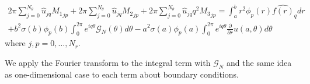 \begin{eqnarray}
 2\pi \sum_{j=0}^{N_\theta} \hat{u}_{jq} {M_1}_{jp}
+ 2\pi \sum_{j=0}^{N_\theta} \hat{u}_{jq} {M_2}_{jp} + 2\pi
\sum_{j=0}^{N_\theta} \hat{u}_{jq} q^2 {M_3}_{jp} = \int_a^b
r^2\phi_p(r) \widehat{f(r)}_q dr \\
+ b^2\sigma(b) \phi_p(b) \int_0^{2\pi}e^{iq\theta} {\mathcal
G}_N(\theta) d\theta - a^2\sigma(a) \phi_p(a)
\int_0^{2\pi}e^{iq\theta} \frac{\partial}{\partial r}u(a,\theta)
d\theta
\end{eqnarray}
where $j, p = 0, \ldots, N_r$.

We apply the Fourier transform to the integral term with
${\mathcal G}_N$ and the same idea as one-dimensional case to each
term about boundary conditions.
